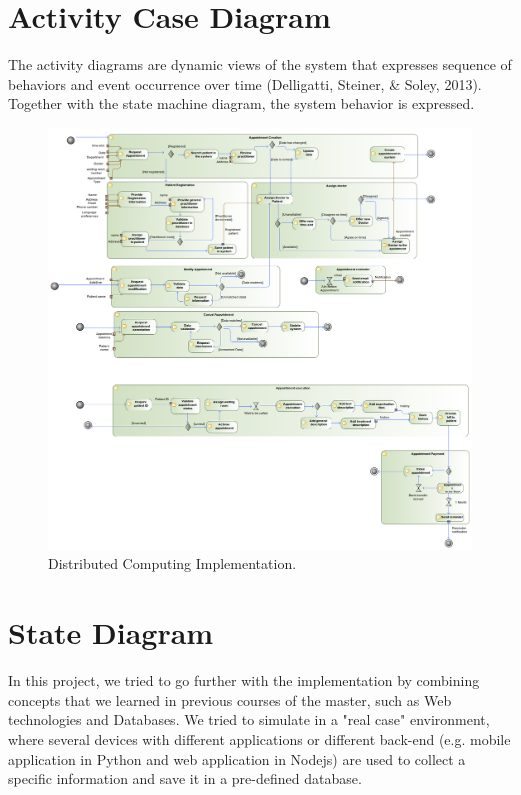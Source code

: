 \documentclass{article}
\begin{document}
            \section{Activity Case Diagram}
            The activity diagrams are dynamic views of the system that expresses sequence of
            behaviors and event occurrence over time (Delligatti, Steiner, & Soley, 2013). Together
            with the state machine diagram, the system behavior is expressed.
            \begin{figure}[H]
                \centering 
                \includegraphics[width=1\linewidth]{./img/Activity.png}
                \caption{Distributed Computing Implementation.}
                \label{fig:architecture}
            \end{figure}
            \section{State Diagram}
            In this project, we tried to go further with the implementation by combining concepts that we learned in previous courses of the master, such as Web technologies and Databases.  
            We tried to simulate in a "real case" environment, where several devices with different applications or different back-end (e.g. mobile application in Python and web application in Nodejs) are used to collect a specific information and save it in a pre-defined database.
    
\end{document}
